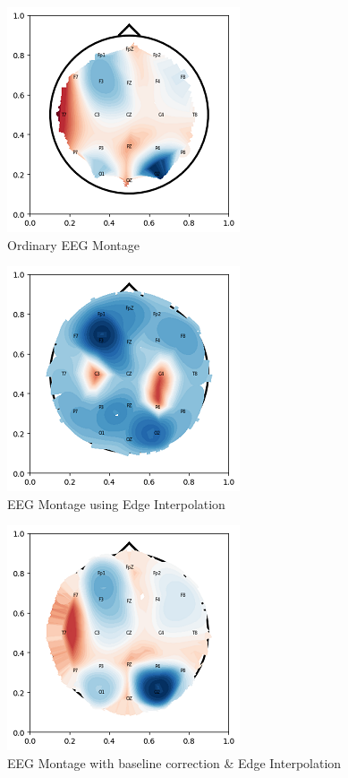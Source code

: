 \documentclass[10pt]{article}
\begin{document}
\clearpage
\begin{figure}
  \includegraphics{ordinary_montage.png}
  \caption{Ordinary EEG Montage}
  \label{fig:ordinary eeg montage}
\end{figure}
\begin{figure}
  \includegraphics{edge_mean_montage.png}
  \caption{EEG Montage using Edge Interpolation}
  \label{fig:EEG montage with edge}
\end{figure}
\begin{figure}
  \includegraphics{edge_mean_baseline_montage.png}
  \caption{EEG Montage with baseline correction \& Edge Interpolation}
  \label{fig:EEG montage with edge and baseline correction}
\end{figure}
\end{document}
